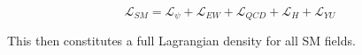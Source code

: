 \begin{equation}
	\mathcal{L}_{SM} = \mathcal{L}_{\psi} + \mathcal{L}_{EW} + \mathcal{L}_{QCD} + \mathcal{L}_{H} + \mathcal{L}_{YU}
\label{eq:sm-lagrangian-2}
\end{equation}

This then constitutes a full Lagrangian density for all \acrlong{SM} fields.


%
%

